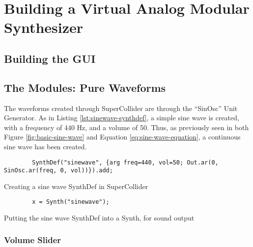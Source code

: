 \chapter[Modular Synthesizer]{Building a Virtual Analog Modular Synthesizer}\label{chapter:building-a-mod-synth}


\section{Building the GUI}\label{section:building-the-gui}

\section{The Modules: Pure Waveforms}

The waveforms created through SuperCollider are through the ``SinOsc'' Unit Generator. As in Listing \ref{lst:sinewave-synthdef}, a simple sine wave is created, with a frequency of 440 Hz, and a volume of 50. Thus, as previously seen in both Figure \ref{fig:basic-sine-wave} and Equation \ref{eq:sine-wave-equation}, a continuous sine wave has been created.

\begin{listing}
	\begin{lstlisting}
		SynthDef("sinewave", {arg freq=440, vol=50; Out.ar(0, SinOsc.ar(freq, 0, vol))}).add;
	\end{lstlisting}
	\caption{Creating a sine wave SynthDef in SuperCollider}
	\label{lst:sinewave-synthdef}
\end{listing}

\begin{listing}
	\begin{lstlisting}
		x = Synth("sinewave");
	\end{lstlisting}
	\caption{Putting the sine wave SynthDef into a Synth, for sound output}
	\label{lst:sinewave-synth}
\end{listing}

\subsection{Volume Slider}

